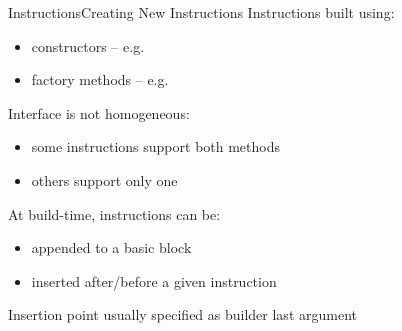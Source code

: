 \documentclass[10pt,mathserif]{beamer}
\begin{document}
\begin{frame}{Instructions}{Creating New Instructions}
Instructions built using:

\begin{itemize}
\item constructors -- e.g. 
\item factory methods -- e.g. 
\end{itemize}

Interface is not homogeneous:

\begin{itemize}
\item some instructions support both methods
\item others support only one
\end{itemize}

\vfill
At build-time, instructions can be:

\begin{itemize}
\item appended to a basic block
\item inserted after/before a given instruction
\end{itemize}

Insertion point usually specified as builder last argument
\end{frame}
\end{document}
